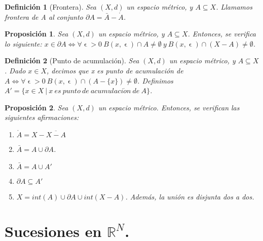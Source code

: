 \documentclass[11pt, a4paper, titlepage]{article}
\let\epsilon\upvarepsilon
\theoremstyle{theorem-style}
\newtheorem*{nprop}{Proposición}
\theoremstyle{definition-style}
\newtheorem*{ndef}{Definición}
\theoremstyle{remark-style}
\theoremstyle{example-style}
\newenvironment{nlist}
{\begin{enumerate}
\renewcommand\labelenumi{(\emph{\roman{enumi})}}}
{\end{enumerate}}
\begin{document}
\begin{ndef}[Frontera]
Sea $(X,d)$ un espacio métrico, y $A\subseteq X$. Llamamos \textit{frontera de A} al conjunto $\partial A = \bar{A}-\mathring{A}$.	
\end{ndef}



\begin{nprop}
Sea $(X,d)$ un espacio métrico, y $A\subseteq X$. Entonces, se verifica lo siguiente:
$x\in \partial A \iff \forall \epsilon > 0\ B(x,\epsilon)\cap A \neq \emptyset \ y\ B(x,\epsilon)\cap (X-A) \neq \emptyset$.
\end{nprop}



\begin{ndef}[Punto de acumulación]
Sea $(X,d)$ un espacio métrico, y $A\subseteq X$. Dado $x\in X$, decimos que \textit{x es punto de acumulación de} $A \iff \forall \epsilon > 0\ B(x,\epsilon)\cap (A-\{x\})\neq \emptyset$. Definimos $A' = \{ x\in X \ | \ x\ es\ punto\ de\ acumulaci\acute{o}n\ de\ A \}$.
\end{ndef}



\begin{nprop}
Sea $(X,d)$ un espacio métrico. Entonces, se verifican las siguientes afirmaciones:

\begin{nlist}
\item $\mathring{A} = X - \overline{X-A}$

\item $\bar{A} = A \cup \partial A$.

\item $\bar{A} = A \cup A'$

\item $\partial A \subseteq A'$

\item $X = int(A) \cup \partial A \cup int(X-A)$. Además, la unión es disjunta dos a dos.
\end{nlist}

\end{nprop}

\newpage


\section{Sucesiones en $\mathbb{R}^N$.}
\end{document}
